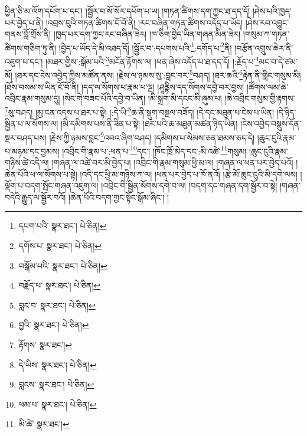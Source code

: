 ཕྱིན་ཅི་མ་ལོག་དཔོག་པ་དང་། །སྦྱོར་བ་སོ་སོར་དཔོག་པ་ཡ། །གཏན་ཚིགས་དག་ཀྱང་ཐ་དད་དོ། །ཤེས་པའི་ཁྱད་པར་བྱེད་པ་ནི། །འབྲས་བུའི་གཏན་ཚིགས་ངོ་བོ་ནི། །རང་བཞིན་གཏན་ཚིགས་འདོད་པ་ཡོད། །ཤེས་རབ་འབྱུང་གནས་བློ་གྲོས་ནི། །ཁྱད་པར་དག་ཀྱང་རང་བཞིན་ཟེར། །ཁ་ཅིག་བྱེད་ཡིན་གཞན་མིན་ཟེར། །གསུམ་ཀ་གཏན་ཚིགས་གཅིག་ཏུ་ནི། །བྱེད་པ་ཡོད་དེ་མི་འཐད་དོ། །སྦྱོར་བ་:དཔགས་པའི་\footnote{དཔག་པའི་  སྣར་ཐང་།  པེ་ཅིན། }:དགོད་པ་\footnote{དགོས་པ་  སྣར་ཐང་།  པེ་ཅིན། }ནི། །བརྩོན་འགྲུས་ཆེར་ནི་འཇུག་པ་དང་། །མཐར་གྱིས་:སྒོམ་པའི་\footnote{བསྒོམ་པའི་  སྣར་ཐང་།  པེ་ཅིན། }མངོན་རྟོགས་ལ། །ཕན་ཞེས་འདོད་པ་ཐ་དད་དོ། །:རྗོད་པ་\footnote{བརྗོད་པ་  སྣར་ཐང་།  པེ་ཅིན། }མང་བ་དེ་ཙམ་མོ། །ཐར་དང་ངེས་འབྱེད་ཀྱིས་མཚོན་ནས། །རྗེས་ལ་ཉམས་སུ་:བླང་བར་\footnote{བླང་བ་  སྣར་ཐང་།  པེ་ཅིན། }བཤད། །ཐར་ཆའི་\footnote{བྱའི་  སྣར་ཐང་།  པེ་ཅིན། }རྟེན་ནི་གླིང་གསུམ་མི། །ཐོས་བསམ་ས་ཡིན་ངོ་བོ་ནི། །དད་ལ་སོགས་པ་རྣམ་པ་ལྔ། །ཤཱནྟིས་དད་སོགས་དབྱེ་བར་བྱས། །ཚོགས་ལམ་ཆེ་འབྲིང་རྣམ་གསུམ་དུ། །སེང་གེ་བཟང་པོའི་དབྱེ་བ་ཡིན། །མི་སྐྲག་མི་དངང་མི་ཞུམ་པ། །ཆེ་འབྲིང་གསུམ་གྱི་རྟགས་\footnote{རྟོགས་  སྣར་ཐང་། }སུ་བཤད། །མྱ་ངན་འདས་པ་ཐར་པ་སྟེ། །:དེ་ཡི་\footnote{དེ་ཡིས་  སྣར་ཐང་།  པེ་ཅིན། }ཆ་ནི་སྡུག་བསྔལ་བཟོད། །དེ་དང་མཐུན་པ་ངེས་པ་ཡིན། །དེ་ཉིད་སྦྱིན་པ་ལ་སོགས་ལ། །མི་དམིགས་པས་ནི་ཟིན་པ་སྟེ། །ཐར་པའི་ཆ་མཐུན་མཚན་ཉིད་ཡིན། །ངེས་འབྱེད་བསྡུས་དོན་སྔར་བཤད་པས། །རྗེས་ཀྱི་ཉམས་བླང་\footnote{བླངས་  སྣར་ཐང་།  པེ་ཅིན། }འབའ་ཞིག་བཤད། །དམིགས་པ་སེམས་ཅན་ཐམས་ཅད་དེ། །ཆུང་ངུའི་རྣམ་པ་མཉམ་དང་བྱམས། །འབྲིང་གི་རྣམ་པ་:ཕན་པ་\footnote{ཕམ་པ་  སྣར་ཐང་།  པེ་ཅིན། }དང་། །ཁོང་ཁྲོ་མེད་དང་:མི་འཚེ་\footnote{མི་ཚེ་  སྣར་ཐང་། }གསུམ། །ཆུང་ངུའི་རྣམ་གཉིས་ཚེ་འདི་ལ། །གཞན་ལ་འཚེ་བར་མི་བྱེད་པ། །འབྲིང་གི་རྣམ་གསུམ་ཕྱི་མ་ལ། །གཞན་ལ་ཕན་པར་བྱེད་པའོ། །ཆེན་པོའི་ཕ་ལ་སོགས་པ་སྟེ། །འདི་དང་ཕྱི་མ་གཉིས་ཀ་ལ། །ཕན་པར་བྱེད་པ་ཁོ་ནའོ། །རྩེ་མོ་ཆུང་ངུའི་མི་དགེ་ལས། །ལྡོག་པ་བདག་སྤོང་གཞན་འཇུག་ལ། །འབྲིང་གི་སྦྱིན་སོགས་དགེ་བ་ལ། །བདག་དང་གཞན་དག་སྦྱོར་བ་སྟེ། །གཞན་བདེའི་རྒྱུད་ལ་སྦྱོར་བའོ། །ཆེན་པོའི་བདག་ཀྱང་སྟོང་སྒོམ་ཞིང་། །
